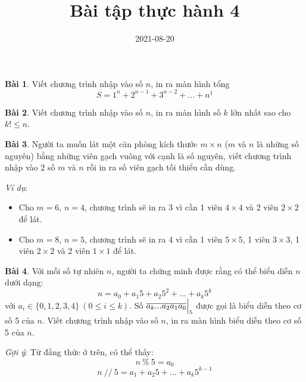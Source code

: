 \documentclass[12pt, a4paper]{article}
\title{Bài tập thực hành 4}
\date{2021-08-20}
\author{}
\begin{document}
    \onehalfspacing
    \maketitle
    \textbf{Bài 1}. Viết chương trình nhập vào số $n$, in ra màn hình tổng
	$$S = 1^n + 2^{n-1} + 3^{n-2} + ... + n^1$$

	\textbf{Bài 2}. Viết chương trình nhập vào số $n$, in ra màn hình số $k$ lớn nhất sao cho $k! \leq n$.

	\textbf{Bài 3}. Người ta muốn lát một căn phòng kích thước $m \times n$ ($m$ và $n$ là những số nguyên) bằng những viên gạch vuông với cạnh là số nguyên,
	viết chương trình nhập vào 2 số $m$ và $n$ rồi in ra số viên gạch tối thiểu cần dùng.

	\textit{Ví dụ}:
	\begin{itemize}
		\item Cho $m = 6$, $n = 4$, chương trình sẽ in ra 3 vì cần 1 viên $4 \times 4$ và 2 viên $2 \times 2$ để lát.
		\item Cho $m = 8$, $n = 5$, chương trình sẽ in ra 4 vì cần 1 viên $5 \times 5$, 1 viên $3 \times 3$, 1 viên $2 \times 2$ và 2 viên $1 \times 1$ để lát.
	\end{itemize} 
	
	\textbf{Bài 4}. Với mỗi số tự nhiên $n$, người ta chứng minh được rằng có thể biểu diễn $n$ dưới dạng:
	$$n = a_0 + a_1 5 + a_2 5^2 + ... + a_k 5^k$$
	với $a_i \in \{0, 1, 2, 3, 4\}\ (0 \leq i \leq k)$. Số $\Bigl.\overline{a_k ... a_2 a_1 a_0}\Bigr|_5$ được gọi là biểu diễn theo cơ số 5 của $n$.
	Viết chương trình nhập vào số $n$, in ra màn hình biểu diễn theo cơ số 5 của $n$.

	\textit{Gợi ý}: Từ đẳng thức ở trên, có thể thấy:
	$$n\ \%\ 5 = a_0$$
	$$n\ //\ 5 = a_1 + a_2 5 + ... + a_k 5^{k-1}$$
\end{document}
